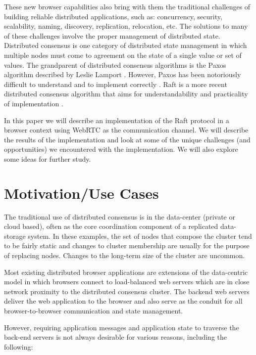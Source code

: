 \documentclass[conference,compsoc]{./IEEEtran/IEEEtran}
\begin{document}
These new browser capabilities also bring with them the traditional
challenges of building reliable distributed applications, such as:
concurrency, security, scalability, naming, discovery, replication,
relocation, etc. The solutions to many of these challenges involve
the proper management of distributed state. Distributed consensus is
one category of distributed state management in which multiple nodes
must come to agreement on the state of a single value or set of values. %
The grandparent of distributed consensus algorithms is the Paxos
algorithm described by Leslie Lamport \cite{paxos:lamport98}. However,
Paxos has been notoriously difficult to understand and to implement
correctly \cite{paxos:chandra07}. Raft is a more recent distributed
consensus algorithm that aims for understandability and practicality
of implementation \cite{raft_thesis:ongaro14}.

In this paper we will describe an implementation of the Raft protocol
in a browser context using WebRTC as the communication channel. We
will describe the results of the implementation and look at some of
the unique challenges (and opportunities) we encountered with the
implementation. We will also explore some ideas for further study.

\section{Motivation/Use Cases}
The traditional use of distributed consensus is in the data-center
(private or cloud based), often as the core coordination component
of a replicated data-storage system. %
In these examples, the set of nodes that compose the cluster tend to
be fairly static and changes to cluster membership are usually for the
purpose of replacing nodes. Changes to the long-term size of the
cluster are uncommon. %

Most existing distributed browser applications are extensions of the
data-centric model in which browsers connect to load-balanced web
servers which are in close network proximity to the distributed
consensus cluster. %
The backend web servers deliver the web application to the browser and
also serve as the conduit for all browser-to-browser communication and
state management.

However, requiring application messages and application state to
traverse the back-end servers is not always desirable for various
reasons, including the following:
\end{document}
